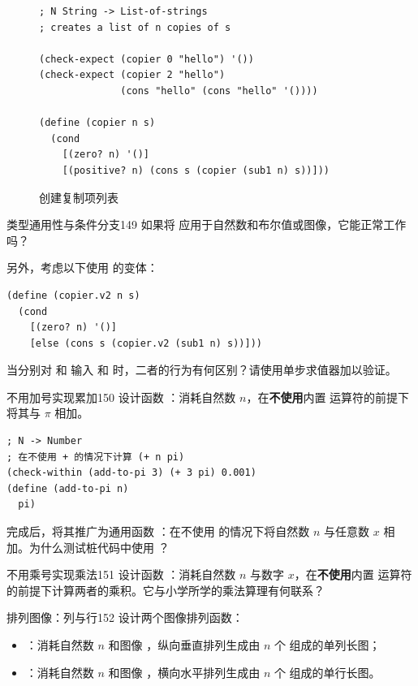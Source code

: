 \begin{figure}[htbp]
  \centering
\begin{lstlisting}[language=BSL]
; N String -> List-of-strings
; creates a list of n copies of s

(check-expect (copier 0 "hello") '())
(check-expect (copier 2 "hello")
              (cons "hello" (cons "hello" '())))

(define (copier n s)
  (cond
    [(zero? n) '()]
    [(positive? n) (cons s (copier (sub1 n) s))]))
\end{lstlisting}
  \caption{创建复制项列表}
  \label{fig:copier_definition}
\end{figure}

\begin{exercise}{类型通用性与条件分支}{149}
如果将  应用于自然数和布尔值或图像，它能正常工作吗？

另外，考虑以下使用  的变体：
\begin{lstlisting}[language=BSL]
(define (copier.v2 n s)
  (cond
    [(zero? n) '()]
    [else (cons s (copier.v2 (sub1 n) s))]))
\end{lstlisting}
当分别对  和  输入  和  时，二者的行为有何区别？请使用单步求值器加以验证。
\end{exercise}

\begin{exercise}{不用加号实现累加}{150}
设计函数 ：消耗自然数 $n$，在\textbf{不使用}内置 \code{+} 运算符的前提下将其与 $\pi$ 相加。
\begin{lstlisting}[language=BSL]
; N -> Number
; 在不使用 + 的情况下计算 (+ n pi)
(check-within (add-to-pi 3) (+ 3 pi) 0.001)
(define (add-to-pi n)
  pi)
\end{lstlisting}
完成后，将其推广为通用函数 ：在不使用 \code{+} 的情况下将自然数 $n$ 与任意数 $x$ 相加。为什么测试桩代码中使用 ？
\end{exercise}

\begin{exercise}{不用乘号实现乘法}{151}
设计函数 ：消耗自然数 $n$ 与数字 $x$，在\textbf{不使用}内置 \code{*} 运算符的前提下计算两者的乘积。它与小学所学的乘法算理有何联系？
\end{exercise}

\begin{exercise}{排列图像：列与行}{152}
设计两个图像排列函数：
\begin{itemize}
  \item {}：消耗自然数 $n$ 和图像 ，纵向垂直排列生成由 $n$ 个  组成的单列长图；
  \item {}：消耗自然数 $n$ 和图像 ，横向水平排列生成由 $n$ 个  组成的单行长图。
\end{itemize}
\end{exercise}

